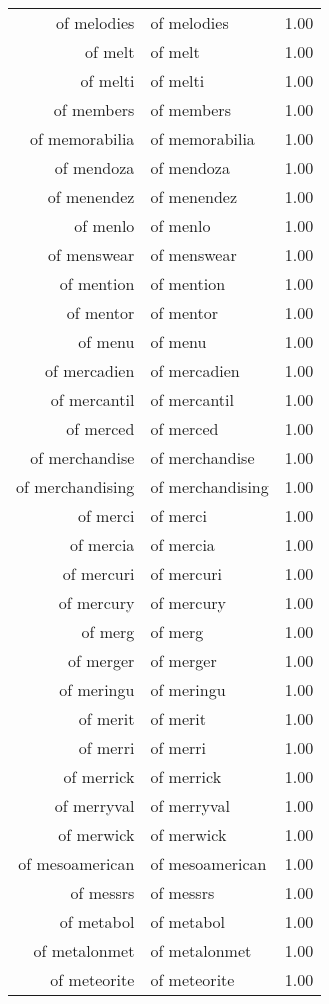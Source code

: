 \begin{table}[ht]
\begin{tabular}{rlr}
  of melodies & of melodies & 1.00 \\ 
  of melt & of melt & 1.00 \\ 
  of melti & of melti & 1.00 \\ 
  of members & of members & 1.00 \\ 
  of memorabilia & of memorabilia & 1.00 \\ 
  of mendoza & of mendoza & 1.00 \\ 
  of menendez & of menendez & 1.00 \\ 
  of menlo & of menlo & 1.00 \\ 
  of menswear & of menswear & 1.00 \\ 
  of mention & of mention & 1.00 \\ 
  of mentor & of mentor & 1.00 \\ 
  of menu & of menu & 1.00 \\ 
  of mercadien & of mercadien & 1.00 \\ 
  of mercantil & of mercantil & 1.00 \\ 
  of merced & of merced & 1.00 \\ 
  of merchandise & of merchandise & 1.00 \\ 
  of merchandising & of merchandising & 1.00 \\ 
  of merci & of merci & 1.00 \\ 
  of mercia & of mercia & 1.00 \\ 
  of mercuri & of mercuri & 1.00 \\ 
  of mercury & of mercury & 1.00 \\ 
  of merg & of merg & 1.00 \\ 
  of merger & of merger & 1.00 \\ 
  of meringu & of meringu & 1.00 \\ 
  of merit & of merit & 1.00 \\ 
  of merri & of merri & 1.00 \\ 
  of merrick & of merrick & 1.00 \\ 
  of merryval & of merryval & 1.00 \\ 
  of merwick & of merwick & 1.00 \\ 
  of mesoamerican & of mesoamerican & 1.00 \\ 
  of messrs & of messrs & 1.00 \\ 
  of metabol & of metabol & 1.00 \\ 
  of metalonmet & of metalonmet & 1.00 \\ 
  of meteorite & of meteorite & 1.00 \\ 

\end{tabular}
\end{table}
